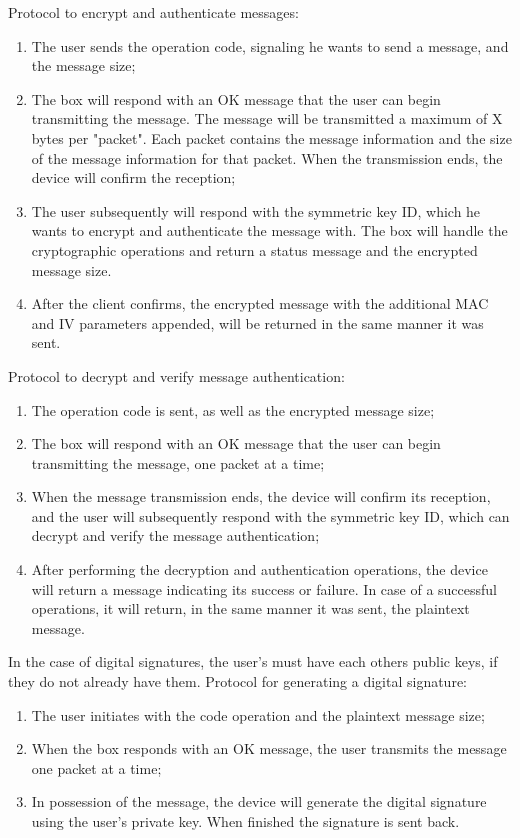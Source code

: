 Protocol to encrypt and authenticate messages:
\begin{enumerate}
    \item The user sends the operation code, signaling he wants to send a message, and the message size;
    \item The box will respond with an OK message that the user can begin transmitting the message. The message will be transmitted a maximum of X bytes per "packet". Each packet contains the message information and the size of the message information for that packet. When the transmission ends, the device will confirm the reception;
    \item The user subsequently will respond with the symmetric key ID, which he wants to encrypt and authenticate the message with. The box will handle the cryptographic operations and return a status message and the encrypted message size.
    \item After the client confirms, the encrypted message with the additional MAC and IV parameters appended, will be returned in the same manner it was sent.
\end{enumerate}

Protocol to decrypt and verify message authentication:

\begin{enumerate}
    \item The operation code is sent, as well as the encrypted message size;
    \item The box will respond with an OK message that the user can begin transmitting the message, one packet at a time;
    \item When the message transmission ends, the device will confirm its reception, and the user will subsequently respond with the symmetric key ID, which can decrypt and verify the message authentication;
    \item After performing the decryption and authentication operations, the device will return a message indicating its success or failure. In case of a successful operations, it will return, in the same manner it was sent, the plaintext message.
\end{enumerate}

In the case of digital signatures, the user's must have each others public keys, if they do not already have them.
Protocol for generating a digital signature:
\begin{enumerate}
    \item The user initiates with the code operation and the plaintext message size;
    \item When the box responds with an OK message, the user transmits the message one packet at a time;
    \item In possession of the message, the device will generate the digital signature using the user's private key. When finished the signature is sent back.
\end{enumerate}

